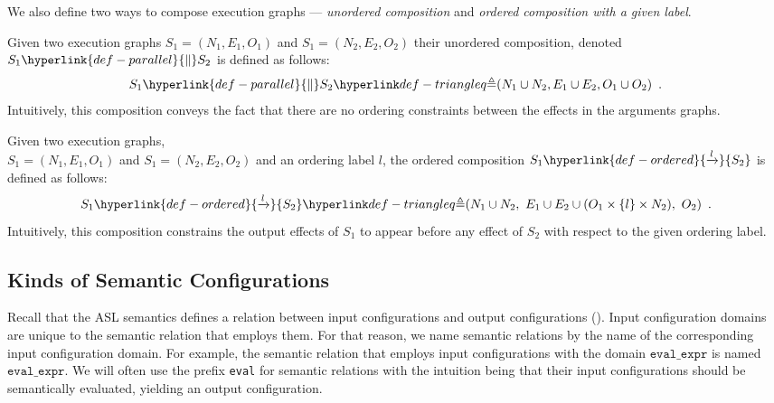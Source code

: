 \documentclass{book}
\newcommand\ordered[3]{{#1}\hyperlink{def-ordered}{\xrightarrow{#2}}{#3}}
\newcommand\parallelcomp[0]{\hyperlink{def-parallel}{\parallel}}
\begin{document}
We also define two ways to compose execution graphs --- \emph{unordered composition} and
\emph{ordered composition with a given label}.

\hypertarget{def-parallel}{}
\begin{definition}
Given two execution graphs $S_1 = (N_1, E_1, O_1)$ and $S_1 = (N_2, E_2, O_2)$ their unordered composition,
denoted $S_1 \parallelcomp S_2$ is defined as follows:
\[
  S_1 \parallelcomp S_2\triangleq (N_1 \cup N_2, E_1 \cup E_2, O_1 \cup O_2) \enspace.
\]
Intuitively, this composition conveys the fact that there are no ordering constraints between the effects
in the arguments graphs.
\end{definition}

\hypertarget{def-ordered}{}
\begin{definition}
Given two execution graphs, \\ $S_1 = (N_1, E_1, O_1)$ and $S_1 = (N_2, E_2, O_2)$ and an ordering label $l$,
the ordered composition $\ordered{S_1}{l}{S_2}$ is defined as follows:
\[
  \ordered{S_1}{l}{S_2} \triangleq (N_1 \cup N_2,\ E_1 \cup E_2 \cup (O_1 \times \{l\} \times N_2),\ O_2) \enspace.
\]
Intuitively, this composition constrains the output effects of $S_1$ to appear before any effect of $S_2$ with respect
to the given ordering label.
\end{definition}

\subsection{Kinds of Semantic Configurations \label{sec:KindsOfSemanticConfigurations}}

Recall that the ASL semantics defines a relation between input configurations and output configurations
().
Input configuration domains are unique to the semantic relation that employs them.
For that reason, we name semantic relations by the name of the corresponding input configuration domain.
For example, the semantic relation that employs input configurations with the domain $\texttt{eval\_expr}$
is named $\texttt{eval\_expr}$.
%
We will often use the prefix \texttt{eval} for semantic relations with the intuition being that their input configurations
should be semantically evaluated, yielding an output configuration.
\end{document}
